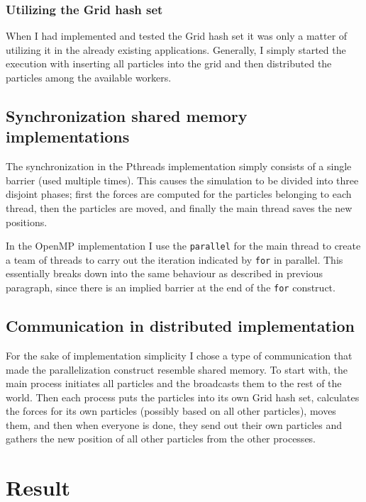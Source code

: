 \documentclass[12pt,a4paper]{article}
\begin{document}
\subsubsection{Utilizing the Grid hash set}

When I had implemented and tested the Grid hash set it was only a matter of
utilizing it in the already existing applications. Generally, I simply started
the execution with inserting all particles into the grid and then distributed
the particles among the available workers.


\subsection{Synchronization shared memory implementations}

The synchronization in the Pthreads implementation simply consists of a single
barrier (used multiple times). This causes the simulation to be divided into
three disjoint phases; first the forces are computed for the particles
belonging to each thread, then the particles are moved, and finally the main
thread saves the new positions.

In the OpenMP implementation I use the \texttt{parallel} for the main thread to
create a team of threads to carry out the iteration indicated by \texttt{for}
in parallel. This essentially breaks down into the same behaviour as described
in previous paragraph, since there is an implied barrier at the end of the
\texttt{for} construct.


\subsection{Communication in distributed implementation}

For the sake of implementation simplicity I chose a type of communication that
made the parallelization construct resemble shared memory. To start with, the
main process initiates all particles and the broadcasts them to the rest of the
world. Then each process puts the particles into its own Grid hash set,
calculates the forces for its own particles (possibly based on all other
particles), moves them, and then when everyone is done, they send out their own
particles and gathers the new position of all other particles from the other
processes.


\section{Result}
\end{document}
